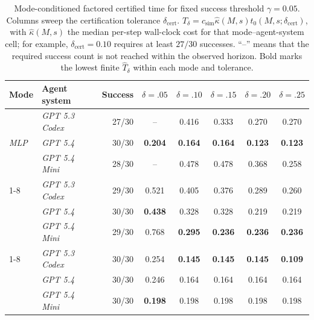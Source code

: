\documentclass{article}
\begin{document}
\begin{table}[t]
\centering
\scriptsize
\setlength{\tabcolsep}{2.4pt}
\caption{Mode-conditioned factored certified time for fixed success threshold \(\gamma=0.05\).
Columns sweep the certification tolerance \(\delta_{\mathrm{cert}}\).
\(\widehat T_{\delta}=c_{\mathrm{sim}}\widehat\kappa(M,s)\widehat t_0(M,s;\delta_{\mathrm{cert}})\), with \(\widehat\kappa(M,s)\) the median per-step wall-clock cost for that mode--agent-system cell; for example, \(\delta_{\mathrm{cert}}=0.10\) requires at least \(27/30\) successes.
``--'' means that the required success count is not reached within the observed horizon.
Bold marks the lowest finite \(\widehat T_{\delta}\) within each mode and tolerance.}
\label{tab:worker-frontier-accounting}
\begin{tabular}{@{}llrccccc@{}}
\toprule
Mode & Agent system & Success & \(\delta=.05\) & \(\delta=.10\) & \(\delta=.15\) & \(\delta=.20\) & \(\delta=.25\) \\
\midrule
\multirow{3}{*}{\textit{MLP}} & \textit{GPT 5.3 Codex} & 27/30 & -- & 0.416 & 0.333 & 0.270 & 0.270 \\
& \textit{GPT 5.4} & 30/30 & \textbf{0.204} & \textbf{0.164} & \textbf{0.164} & \textbf{0.123} & \textbf{0.123} \\
& \textit{GPT 5.4 Mini} & 28/30 & -- & 0.478 & 0.478 & 0.368 & 0.258 \\
\cmidrule(lr){1-8}
\multirow{3}{*}{\textit{CNN}} & \textit{GPT 5.3 Codex} & 29/30 & 0.521 & 0.405 & 0.376 & 0.289 & 0.260 \\
& \textit{GPT 5.4} & 30/30 & \textbf{0.438} & 0.328 & 0.328 & 0.219 & 0.219 \\
& \textit{GPT 5.4 Mini} & 29/30 & 0.768 & \textbf{0.295} & \textbf{0.236} & \textbf{0.236} & \textbf{0.236} \\
\cmidrule(lr){1-8}
\multirow{3}{*}{\textit{ResNet}} & \textit{GPT 5.3 Codex} & 30/30 & 0.254 & \textbf{0.145} & \textbf{0.145} & \textbf{0.145} & \textbf{0.109} \\
& \textit{GPT 5.4} & 30/30 & 0.246 & 0.164 & 0.164 & 0.164 & 0.164 \\
& \textit{GPT 5.4 Mini} & 30/30 & \textbf{0.198} & 0.198 & 0.198 & 0.198 & 0.198 \\
\bottomrule
\end{tabular}
\end{table}
\end{document}
